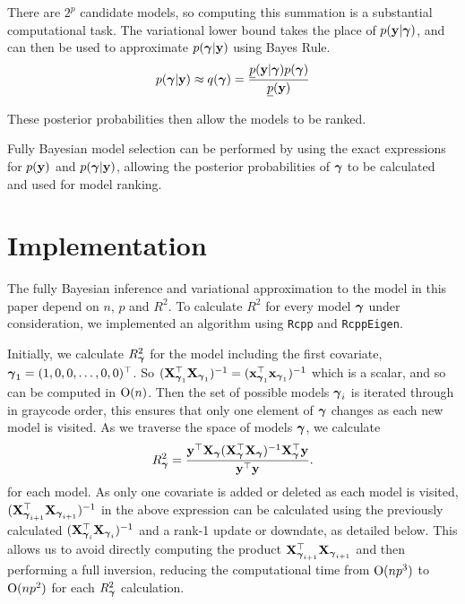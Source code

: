 \documentclass{amsart}[12pt]
\begin{document}
\noindent There are $2^p$ candidate models, so computing this summation is a substantial computational task. The
variational lower bound takes the place of $p({\bf y}|{\boldsymbol \gamma})$, and can then be used to approximate
$p({\boldsymbol \gamma}|{\bf y})$ using Bayes Rule.
$$p({\boldsymbol \gamma}|{\bf y}) \approx q({\boldsymbol \gamma}) = \frac{\underline{p}({\bf y}|{\boldsymbol \gamma}) p({\boldsymbol \gamma})}{\underline{p}({\bf y})}$$

\noindent These posterior probabilities then allow the models to be ranked.

Fully Bayesian model selection can be performed by using the exact expressions for $p({\bf y})$ and $p({\boldsymbol \gamma}|{\bf y})$, allowing the posterior probabilities of ${\boldsymbol \gamma}$ to be calculated and used for model ranking.

\section{Implementation}
\label{sec:implementation}


The fully Bayesian inference and variational approximation to the model in this paper depend on $n$, $p$ and
$R^2$. To calculate $R^2$ for every model ${\boldsymbol \gamma}$ under consideration, we implemented an algorithm using
\texttt{Rcpp} and \texttt{RcppEigen}.

Initially, we calculate $R^2_{\boldsymbol \gamma}$ for the model including the first covariate, ${\boldsymbol \gamma}_1 = (1, 0, 0,
\ldots, 0, 0)^\top$. So $({\bf X}_{{\boldsymbol \gamma}_1}^\top {\bf X}_{{\boldsymbol \gamma}_1})^{-1} = ({\bf x}_{{\boldsymbol \gamma}_1}^\top
{\bf x}_{{\boldsymbol \gamma}_1})^{-1}$ which is a scalar, and so can be computed in $\text{O}(n)$. Then the set of possible
models ${\boldsymbol \gamma}_i$ is iterated through in graycode order, this ensures that only one element of ${\boldsymbol \gamma}$
changes as each new model is visited. As we traverse the space of models ${\boldsymbol \gamma}$, we calculate
\[
	R^2_{\boldsymbol \gamma} = \frac{{\bf y}^\top {\bf X}_{\boldsymbol \gamma} ({\bf X}_{\boldsymbol \gamma}^\top {\bf X}_{\boldsymbol \gamma})^{-1} {\bf X}_{\boldsymbol \gamma}^\top {\bf y}}{{\bf y}^\top {\bf y}}.
\]
for each model. As only one covariate is added or deleted as each model is visited, $({\bf X}_{{\boldsymbol \gamma}_{i+1}}^\top
{\bf X}_{{\boldsymbol \gamma}_{i+1}})^{-1}$ in the above expression can be calculated using the previously calculated
$({\bf X}_{{\boldsymbol \gamma}_i}^\top {\bf X}_{{\boldsymbol \gamma}_i})^{-1}$ and a rank-1 update or downdate, as detailed below. This allows
us to avoid directly computing the product ${\bf X}_{{\boldsymbol \gamma}_{i+1}}^\top {\bf X}_{{\boldsymbol \gamma}_{i+1}}$ and then performing
a full inversion, reducing the computational time from $\text{O}(n p^3)$  to $\text{O}(n p^2)$ for each
$R^2_{\boldsymbol \gamma}$ calculation.
\end{document}

